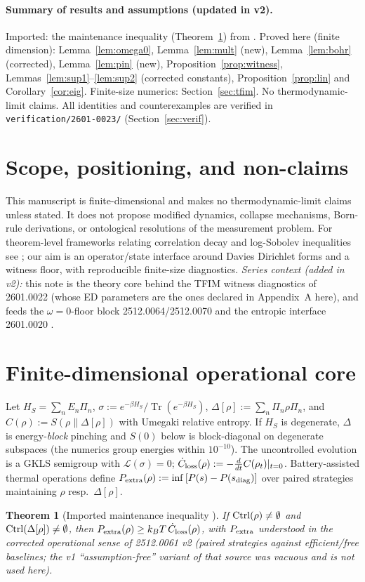 \documentclass[11pt]{article}
\newtheorem{theorem}{Theorem}[section]
\theoremstyle{remark}
\newcommand{\Tr}{\operatorname{Tr}}
\begin{document}
\paragraph{Summary of results and assumptions (updated in v2).}
Imported: the maintenance inequality (Theorem~\ref{thm:maint}) from
\cite{S0061}. Proved here (finite dimension): Lemma~\ref{lem:omega0},
Lemma~\ref{lem:mult} (new), Lemma~\ref{lem:bohr} (corrected),
Lemma~\ref{lem:pin} (new), Proposition~\ref{prop:witness},
Lemmas~\ref{lem:sup1}--\ref{lem:sup2} (corrected constants),
Proposition~\ref{prop:lin} and Corollary~\ref{cor:eig}. Finite-size
numerics: Section~\ref{sec:tfim}. No thermodynamic-limit claims. All
identities and counterexamples are verified in
\texttt{verification/2601-0023/} (Section~\ref{sec:verif}).

\section{Scope, positioning, and non-claims}
This manuscript is finite-dimensional and makes no thermodynamic-limit
claims unless stated. It does not propose modified dynamics, collapse
mechanisms, Born-rule derivations, or ontological resolutions of the
measurement problem. For theorem-level frameworks relating correlation
decay and log-Sobolev inequalities see \cite{Capel, CM}; our aim is an
operator/state interface around Davies Dirichlet forms and a witness
floor, with reproducible finite-size diagnostics. \emph{Series context
(added in v2):} this note is the theory core behind the TFIM witness
diagnostics of 2601.0022 \cite{S0022} (whose ED parameters are the ones
declared in Appendix~A here), and feeds the $\omega = 0$-floor block
2512.0064/2512.0070 \cite{S0064, S0070} and the entropic interface
2601.0020 \cite{S0020}.

\section{Finite-dimensional operational core}
Let $H_S = \sum_n E_n \Pi_n$, $\sigma := e^{-\beta H_S}/\Tr(e^{-\beta H_S})$,
$\Delta[\rho] := \sum_n \Pi_n \rho \Pi_n$, and
$C(\rho) := S(\rho\|\Delta[\rho])$ with Umegaki relative entropy. If $H_S$
is degenerate, $\Delta$ is energy-\emph{block} pinching and $S(0)$ below is
block-diagonal on degenerate subspaces (the numerics group energies within
$10^{-10}$). The uncontrolled evolution is a GKLS semigroup with
$\mathcal{L}(\sigma) = 0$; $\dot C_{\rm loss}(\rho) := -\frac{d}{dt}
C(\rho_t)|_{t=0}$. Battery-assisted thermal operations define
$P_{\rm extra}(\rho) := \inf\,[P(s) - P(s_{\rm diag})]$ over paired
strategies maintaining $\rho$ resp.\ $\Delta[\rho]$.
\begin{theorem}[Imported maintenance inequality \cite{S0061}]
\label{thm:maint}
If ${\rm Ctrl}(\rho) \neq \emptyset$ and ${\rm Ctrl}(\Delta[\rho]) \neq
\emptyset$, then $P_{\rm extra}(\rho) \ge k_B T\, \dot C_{\rm loss}(\rho)$,
with $P_{\rm extra}$ understood in the corrected operational sense of
2512.0061 v2 (paired strategies against efficient/free baselines; the v1
``assumption-free'' variant of that source was vacuous and is not used
here).
\end{theorem}
\end{document}
